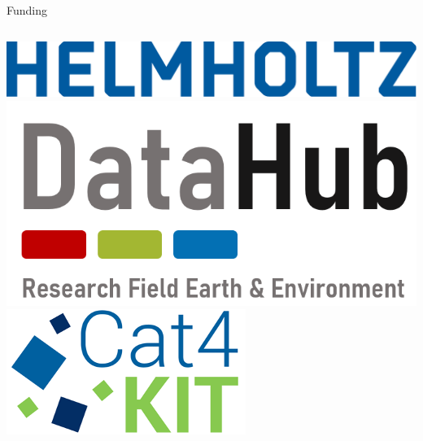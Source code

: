\begin{frame}{Funding}
\begin{columns}[T]
		\begin{column}{0.3\linewidth}
			\href{https://www.helmholtz.de/}{
				\includegraphics[width=\linewidth]{figures/helmholtz.pdf}
			} \\
			\vspace{1em}
			\href{https://datahub.erde-und-umwelt.de}{
				\includegraphics[width=\linewidth]{figures/datahub.png}
			} \\
			\vspace{1em}
			\href{https://kit.edu}{
				\includegraphics[width=0.5\linewidth]{figures/cat4kit.png}
			}
		\end{column}
	\end{columns}
\end{frame}
